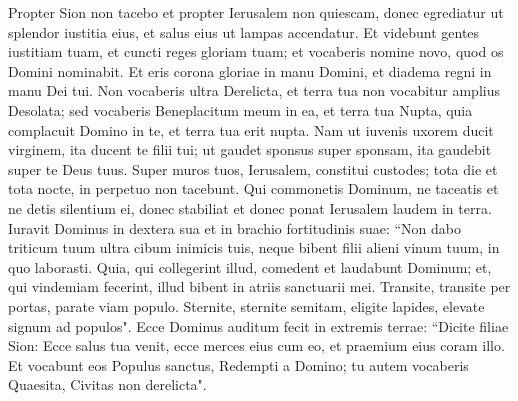 \begin{biblechapter}  
\verse Propter Sion non tacebo et propter Ierusalem non quiescam, donec egrediatur ut splendor iustitia eius, et salus eius ut lampas accendatur. 
\verse Et videbunt gentes iustitiam tuam, et cuncti reges gloriam tuam; et vocaberis nomine novo, quod os Domini nominabit. 
\verse Et eris corona gloriae in manu Domini, et diadema regni in manu Dei tui. 
\verse Non vocaberis ultra Derelicta, et terra tua non vocabitur amplius Desolata; sed vocaberis Beneplacitum meum in ea, et terra tua Nupta, quia complacuit Domino in te, et terra tua erit nupta. 
\verse Nam ut iuvenis uxorem ducit virginem, ita ducent te filii tui; ut gaudet sponsus super sponsam, ita gaudebit super te Deus tuus. 
\verse Super muros tuos, Ierusalem, constitui custodes; tota die et tota nocte, in perpetuo non tacebunt. Qui commonetis Dominum, ne taceatis 
\verse et ne detis silentium ei, donec stabiliat et donec ponat Ierusalem laudem in terra. 
\verse Iuravit Dominus in dextera sua et in brachio fortitudinis suae: “Non dabo triticum tuum ultra cibum inimicis tuis, neque bibent filii alieni vinum tuum, in quo laborasti. 
\verse Quia, qui collegerint illud, comedent et laudabunt Dominum; et, qui vindemiam fecerint, illud bibent in atriis sanctuarii mei. 
\verse Transite, transite per portas, parate viam populo. Sternite, sternite semitam, eligite lapides, elevate signum ad populos". 
\verse Ecce Dominus auditum fecit in extremis terrae: “Dicite filiae Sion: Ecce salus tua venit, ecce merces eius cum eo, et praemium eius coram illo. 
\verse Et vocabunt eos Populus sanctus, Redempti a Domino; tu autem vocaberis Quaesita, Civitas non derelicta". 
\end{biblechapter}

